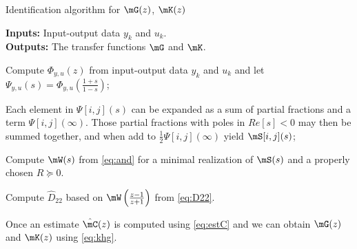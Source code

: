   \begin{algorithm}
    \caption{Identification algorithm for $\mG(z)$, $\mK(z)$}
    \textbf{Inputs:} Input-output data $y_k$ and $u_k$.\\
    \textbf{Outputs:} The transfer functions $\mG$ and $\mK$.	  
    \begin{step}
      Compute $\Phi_{y,u}(z)$ from input-output data $y_k$ and $u_k$ and let $\Psi_{y,u}(s)=\Phi_{y,u}(\frac{1+s}{1-s})$;	  
    \end{step}
    \begin{step}
      Each element in $\Psi[i,j](s)$ can be expanded as a sum of partial fractions and a term $\Psi[i,j](\infty)$. Those partial fractions with poles in $Re[s] < 0$ may then be summed together, and when add to $\frac{1}{2}\Psi[i,j](\infty)$ yield $\mS[i,j](s)$;
    \end{step}
    \begin{step}
      Compute $\mW(s)$ from \eqref{eq:and} for a minimal realization of $\mS(s)$ and a properly chosen $R\succeq0$.
    \end{step}
    \begin{step}
      Compute $\hat{D}_{22}$ based on $\mW\left(\frac{z-1}{z+1}\right)$ from \eqref{eq:D22}.
    \end{step} 
    \begin{step}
      Once an estimate $\hat{\mC}(z)$ is computed using \eqref{eq:estC} and we can obtain $\mG(z)$ and $\mK(z)$ using \eqref{eq:khg}.
    \end{step}
    \label{alg:main}
  \end{algorithm}

